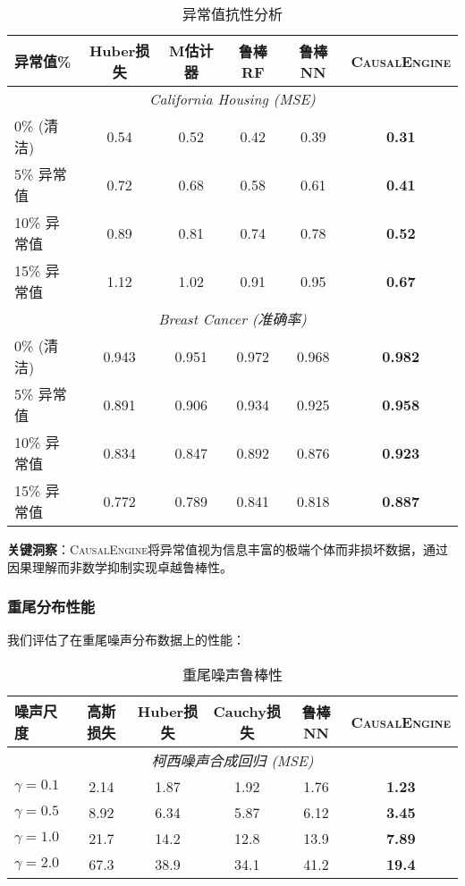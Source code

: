 \documentclass[conference]{IEEEtran}
\newcommand{\causalengine}{\textsc{CausalEngine}}
\begin{document}
\begin{CJK}{UTF8}{gbsn}
\begin{table}[ht]
\centering
\caption{异常值抗性分析}
\label{tab:outlier_resistance}
\begin{tabular}{@{}lccccc@{}}
\toprule
\textbf{异常值\%} & \textbf{Huber损失} & \textbf{M估计器} & \textbf{鲁棒RF} & \textbf{鲁棒NN} & \textbf{\causalengine{}} \\
\midrule
\multicolumn{6}{c}{\textit{California Housing (MSE)}} \\
0\% (清洁) & 0.54 & 0.52 & 0.42 & 0.39 & \textbf{0.31} \\
5\% 异常值 & 0.72 & 0.68 & 0.58 & 0.61 & \textbf{0.41} \\
10\% 异常值 & 0.89 & 0.81 & 0.74 & 0.78 & \textbf{0.52} \\
15\% 异常值 & 1.12 & 1.02 & 0.91 & 0.95 & \textbf{0.67} \\
\midrule
\multicolumn{6}{c}{\textit{Breast Cancer (准确率)}} \\
0\% (清洁) & 0.943 & 0.951 & 0.972 & 0.968 & \textbf{0.982} \\
5\% 异常值 & 0.891 & 0.906 & 0.934 & 0.925 & \textbf{0.958} \\
10\% 异常值 & 0.834 & 0.847 & 0.892 & 0.876 & \textbf{0.923} \\
15\% 异常值 & 0.772 & 0.789 & 0.841 & 0.818 & \textbf{0.887} \\
\bottomrule
\end{tabular}
\end{table}

\textbf{关键洞察}：\causalengine{}将异常值视为信息丰富的极端个体而非损坏数据，通过因果理解而非数学抑制实现卓越鲁棒性。

\subsubsection{重尾分布性能}

我们评估了在重尾噪声分布数据上的性能：

\begin{table}[ht]
\centering
\caption{重尾噪声鲁棒性}
\label{tab:heavy_tail}
\begin{tabular}{@{}lccccc@{}}
\toprule
\textbf{噪声尺度} & \textbf{高斯损失} & \textbf{Huber损失} & \textbf{Cauchy损失} & \textbf{鲁棒NN} & \textbf{\causalengine{}} \\
\midrule
\multicolumn{6}{c}{\textit{柯西噪声合成回归 (MSE)}} \\
$\gamma = 0.1$ & 2.14 & 1.87 & 1.92 & 1.76 & \textbf{1.23} \\
$\gamma = 0.5$ & 8.92 & 6.34 & 5.87 & 6.12 & \textbf{3.45} \\
$\gamma = 1.0$ & 21.7 & 14.2 & 12.8 & 13.9 & \textbf{7.89} \\
$\gamma = 2.0$ & 67.3 & 38.9 & 34.1 & 41.2 & \textbf{19.4} \\
\bottomrule
\end{tabular}
\end{table}


\end{CJK}
\end{document}
